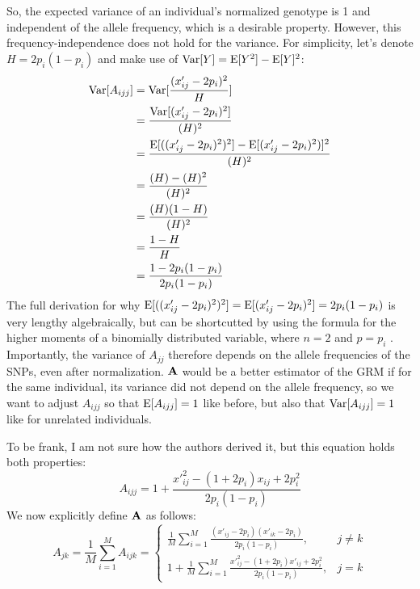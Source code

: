 \documentclass[12pt]{article}
\begin{document}
So, the expected variance of an individual's normalized genotype is 1 and independent of the allele frequency, which is a desirable property.
However, this frequency-independence does not hold for the variance.
For simplicity, let's denote $H = 2 p_i (1 - p_i)$ and make use of $\mathrm{Var}[Y] = \mathrm{E}[Y^2] - \mathrm{E}[Y]^2$:
\begin{align*}
    \mathrm{Var}[A_{ijj}] &= \mathrm{Var}[\frac{(x'_{ij} - 2 p_i)^2}{H}] \\
    &= \frac{\mathrm{Var}[(x'_{ij} - 2 p_i)^2]}{(H)^2} \\
    &= \frac{\mathrm{E}[((x'_{ij} - 2 p_i)^2)^2] - \mathrm{E}[(x'_{ij} - 2 p_i)^2)]^2}{(H)^2} \\
    &= \frac{(H) - (H)^2}{(H)^2} \\
    &= \frac{(H)(1  - H)}{(H)^2} \\
    &= \frac{1 - H}{H} \\
    &= \frac{1 - 2 p_i (1 - p_i)}{2 p_i (1 - p_i)} \\
\end{align*}
The full derivation for why $\mathrm{E}[((x'_{ij} - 2 p_i)^2)^2] = \mathrm{E}[(x'_{ij} - 2 p_i)^2] = 2 p_i (1 - p_i)$ is very lengthy algebraically, but can be shortcutted by using the formula for the higher moments of a binomially distributed variable, where $n=2$ and $p=p_i$ \citep{wikipedia2026webBinomial}.
Importantly, the variance of $A_{jj}$ therefore depends on the allele frequencies of the SNPs, even after normalization.
$\mathbf{A}$ would be a better estimator of the GRM if for the same individual, its variance did not depend on the allele frequency, so we want to adjust $A_{ijj}$ so that $\mathrm{E}[A_{ijj}] = 1$ like before, but also that $\mathrm{Var}[A_{ijj}] = 1$ like for unrelated individuals.

To be frank, I am not sure how the authors derived it, but this equation holds both properties:
$$A_{ijj} = 1 + \frac{{x'}_{ij}^2 - (1 + 2 p_i) x_{ij} + 2 p_i^2}{2 p_i (1 - p_i)} $$
We now explicitly define $\mathbf{A}$ as follows:
$$
A_{jk} = \frac{1}{M}\sum_{i=1}^{M} A_{ijk} = 
\begin{cases}
\frac{1}{M}\sum_{i=1}^{M} \frac{(x'_{ij} - 2 p_i)(x'_{ik} - 2 p_i)}{ 2 p_i (1 - p_i)}, & j \neq k \\[10pt]
1 + \frac{1}{M}\sum_{i=1}^{M} \frac{{x'}_{ij}^2 - (1 + 2 p_i) x'_{ij} + 2 p_i^2}{2 p_i (1 - p_i)}, & j = k
\end{cases}
$$
\end{document}
